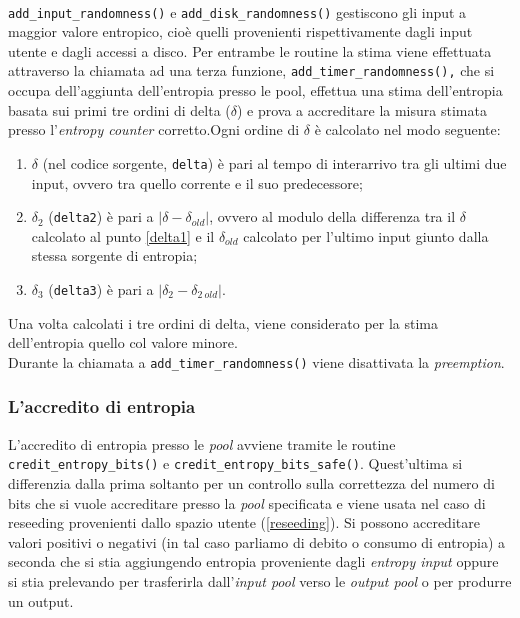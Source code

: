 \documentclass{article}
\begin{document}
 \paragraph{}\verb+add_input_randomness()+ e \verb+add_disk_randomness()+
 gestiscono gli input a maggior valore entropico, cioè quelli provenienti
 rispettivamente dagli input utente e dagli accessi a disco. Per entrambe le
 routine la stima viene effettuata attraverso la chiamata ad una terza funzione,
 \verb+add_timer_randomness(),+ che si occupa dell'aggiunta dell'entropia presso
 le pool, effettua una stima dell'entropia basata sui primi tre ordini di delta
 ($\delta$) e prova a accreditare la misura stimata presso l'\emph{entropy
 counter} corretto.\newline{}Ogni ordine di $\delta$ è calcolato nel modo
 seguente:
 \begin{enumerate}
   \item $\delta$ (nel codice sorgente, \verb+delta+) è pari al tempo di
   interarrivo tra gli ultimi due input, ovvero tra quello corrente e il suo
   predecessore;\label{delta1}
   \item $\delta_2$ (\verb+delta2+) è pari a $|\delta-\delta_{old}|$, ovvero al
   modulo della differenza tra il $\delta$ calcolato al punto \ref{delta1} e il
   $\delta_{old}$ calcolato per l'ultimo input giunto dalla stessa sorgente di entropia;
   \item $\delta_3$ (\verb+delta3+) è pari a $|\delta_2-\delta_{2\ old}|$.
 \end{enumerate}
 Una volta calcolati i tre ordini di delta, viene considerato per la stima
 dell'entropia quello col valore minore.\\ Durante la chiamata a
 \verb+add_timer_randomness()+ viene disattivata la \emph{preemption}.
 
 \subsubsection{L'accredito di entropia}\label{credit}
 L'accredito di entropia presso le \emph{pool} avviene tramite le routine
 \verb+credit_entropy_bits()+ e \newline{}\verb+credit_entropy_bits_safe()+.
 Quest'ultima si differenzia dalla prima soltanto per un controllo sulla correttezza del
 numero di bits che si vuole accreditare presso la \emph{pool} specificata e
 viene usata nel caso di reseeding provenienti dallo spazio utente
 (\ref{reseeding}).
 \newline{}Si possono accreditare valori positivi o negativi (in tal caso
 parliamo di debito o consumo di entropia) a seconda che si stia aggiungendo
 entropia proveniente dagli \emph{entropy input} oppure si stia prelevando per
 trasferirla dall'\emph{input pool} verso le \emph{output pool} o per produrre un output. 
\end{document}
